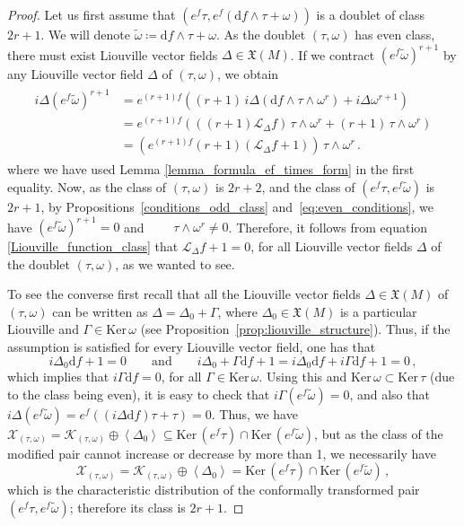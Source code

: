 \documentclass[10pt,a4paper]{amsart}
\def\Ker{\mathrm{Ker \,}}
\def\K{\mathcal{K}}
\newcommand{\Lie}{\mathscr{L}}
\newcommand{\X}{\mathfrak{X}}
\newcommand{\inn}{i}
\renewcommand{\d}{\mathrm{d}}
\begin{document}
\begin{proof}
   Let us first assume that 
   $(e^f\tau, e^f(\d f\wedge \tau+\omega))$ 
   is a doublet of class $2r+1$. We will denote $\widetilde \omega \coloneqq \d f \wedge \tau+\omega$. As the doublet $(\tau,\omega)$ has even class, there must exist Liouville vector fields $\Delta \in \X(M)$.
    If we contract $(e^f\widetilde \omega)^{r+1}$ by any Liouville vector field $\Delta$ of $(\tau,\omega)$, we obtain
\begin{align}\label{Liouville_function_class}
    \begin{aligned}
        \inn{\Delta}(e^f\widetilde \omega )^{r+1} &=  e^{(r+1)f}((r+1)\, \inn{\Delta}(\d f \wedge\tau\wedge\omega^{r})+\inn{\Delta}\omega^{r+1})
        \\
        &=e^{(r+1)f}(((r+1)\Lie_{\Delta}f)\,\tau\wedge\omega^{r} + (r+1) \,\tau\wedge\omega^{r})
        \\
        &=(e^{(r+1)f}(r+1)(\Lie_{\Delta} f +1 ))\,\tau\wedge\omega^{r}\,.
        \end{aligned}
    \end{align}
    where we have used Lemma \ref{lemma_formula_ef_times_form} in the first equality.
Now, as the class of $(\tau,\omega)$ is $2r+2$, and the class of $(e^f \tau, e^f \widetilde \omega )$ is $2r+1$, by Propositions~\ref{conditions_odd_class} and~\ref{eq:even_conditions}, we have
$(e^f\widetilde \omega)^{r+1}=0$ and $ \qquad\tau\wedge\omega^r\neq 0$. 
Therefore, it follows from equation \eqref{Liouville_function_class} that 
$ \Lie_{\Delta} f +1=0 $,
for all Liouville vector fields $\Delta$ of the doublet $(\tau,\omega)$, as we wanted to see.

To see the converse first recall that all the Liouville vector fields $\Delta\in\X(M)$ of $(\tau,\omega)$
can be written as $\Delta = \Delta_0+\Gamma$, where $\Delta_0\in\X(M)$ is a particular Liouville and $\Gamma\in \Ker\omega$ (see Proposition~\ref{prop:liouville_structure}). Thus, if the assumption is satisfied for every Liouville vector field, one has that
$$\inn{\Delta_0}\d f+1=0\qquad \text{and} \qquad \inn{\Delta_0+\Gamma}\d f +1=\inn{\Delta_0}\d f+\inn{\Gamma}\d f+1=0\,,$$
which implies that 
$\inn{\Gamma}\d f = 0$,
for all $\Gamma \in \Ker\omega$. 
Using this and $\Ker\omega \subset \Ker \tau$ (due to the class being even), it is easy to check that
$\inn{\Gamma} (e^f\widetilde \omega) = 0$,
and also that
$ \inn{\Delta}(e^f\widetilde \omega) = e^f((\inn{\Delta} \d f)\tau + \tau) = 0$.
Thus, we have
$ \mathcal{X}_{(\tau,\omega)} =\K_{(\tau,\omega)} \oplus \left\langle \Delta_0 \right\rangle  \subseteq \Ker (e^f \tau )\cap \Ker (e^f\widetilde \omega)$,
but as the class of the modified pair cannot increase or decrease by more than 1, we necessarily have
$$\mathcal{X}_{(\tau,\omega)}=\K_{(\tau,\omega)} \oplus \left\langle \Delta_0 \right\rangle  = \Ker (e^f \tau )\cap \Ker (e^f\widetilde \omega)\,,$$
which is the characteristic distribution of the conformally transformed pair
$(e^f\tau,e^f\widetilde \omega)$;
therefore its class is $2r+1$.
\end{proof}
\end{document}
